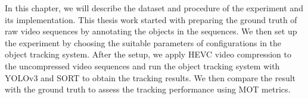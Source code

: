 In this chapter, we will describe the dataset and procedure of the experiment and its implementation. This thesis work started with preparing the ground truth of raw video sequences by annotating the objects in the sequences. We then set up the experiment by choosing the suitable parameters of configurations in the object tracking system. After the setup, we apply HEVC video compression to the uncompressed video sequences and run the object tracking system with YOLOv3 and SORT to obtain the tracking results. We then compare the result with the ground truth to assess the tracking performance using MOT metrics.